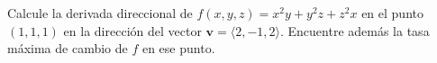Calcule la derivada direccional de $f(x, y, z) = x^2 y + y^2 z + z^2 x$ en el punto $(1, 1, 1)$ en la dirección del vector $\mathbf{v} = \langle 2, -1, 2 \rangle$. Encuentre además la tasa máxima de cambio de $f$ en ese punto.
